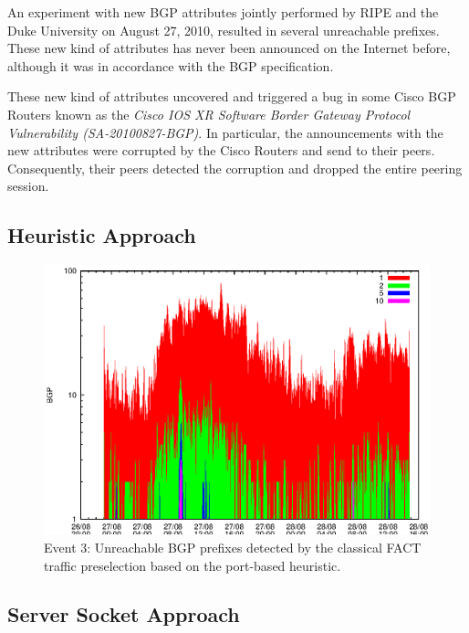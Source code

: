 An experiment with new BGP attributes jointly performed by RIPE and the Duke 
University on August 27, 2010, resulted in several unreachable prefixes\citep{SchatzmannPAM2011}. These 
new kind of attributes has never been announced on the Internet before,  
although it was in accordance with the BGP specification\citep{ripe_duke}.

These new kind of attributes uncovered and triggered a bug in some Cisco BGP 
Routers known as the \emph{Cisco IOS XR Software Border Gateway Protocol Vulnerability (SA-20100827-BGP)}\citep{cisco_vulnerability}. In particular, the announcements with the new attributes were corrupted 
by the Cisco Routers and send to their peers. Consequently, their peers detected 
the corruption and dropped the entire peering session\citep{ripe_duke}.

\subsection{Heuristic Approach}

\begin{figure}
	[p] \centering 
	\includegraphics[width=0.75\linewidth]{images/events/2010_08_27/bgp_log_port80_ref.eps}
	\caption{Event 3: Unreachable BGP prefixes detected by the classical FACT traffic preselection based on the port-based heuristic.} 
	\label{fig:RIPE_FACT_REF} 
\end{figure}

\subsection{Server Socket Approach}

